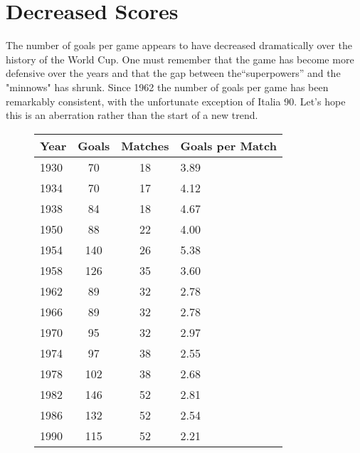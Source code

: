 \section{Decreased Scores}
The number of goals per game appears to have decreased dramatically over the 
history of the World Cup. One must remember that the game has become more 
defensive over the years and that the gap between the``superpowers'' and the 
"minnows" has shrunk. Since 1962 the number of goals per game has been 
remarkably consistent, with the unfortunate exception of Italia 90. Let's hope 
this is an aberration rather than the start of a new trend.
\begin{figure}[H]
\begin{tabular}{l c c l}
Year & Goals & Matches & Goals per Match \\ \hline
1930 & 70 & 18 & 3.89 \\
1934 & 70 & 17 & 4.12 \\
1938 & 84 & 18 & 4.67 \\
1950 &  88 & 22 & 4.00 \\
1954 & 140 & 26 & 5.38 \\
1958 & 126 & 35 & 3.60 \\
1962 & 89 & 32 & 2.78 \\
1966 & 89 & 32 & 2.78 \\
1970 & 95 & 32 & 2.97 \\
1974 & 97 & 38 & 2.55 \\
1978 & 102 & 38 & 2.68 \\
1982 & 146 & 52 & 2.81 \\
1986 & 132 & 52 & 2.54 \\
1990 & 115 & 52 & 2.21 \\ \hline
\end{tabular}
\end{figure}
